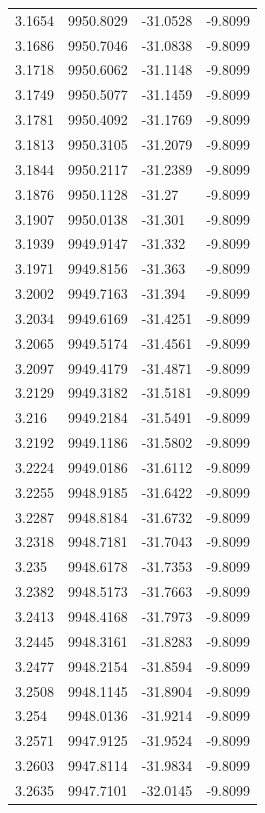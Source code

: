 \begin{table}[H]
\begin{tabular}{llll}
3.1654 & 9950.8029 & -31.0528 & -9.8099 \\
3.1686 & 9950.7046 & -31.0838 & -9.8099 \\
3.1718 & 9950.6062 & -31.1148 & -9.8099 \\
3.1749 & 9950.5077 & -31.1459 & -9.8099 \\
3.1781 & 9950.4092 & -31.1769 & -9.8099 \\
3.1813 & 9950.3105 & -31.2079 & -9.8099 \\
3.1844 & 9950.2117 & -31.2389 & -9.8099 \\
3.1876 & 9950.1128 & -31.27 & -9.8099 \\
3.1907 & 9950.0138 & -31.301 & -9.8099 \\
3.1939 & 9949.9147 & -31.332 & -9.8099 \\
3.1971 & 9949.8156 & -31.363 & -9.8099 \\
3.2002 & 9949.7163 & -31.394 & -9.8099 \\
3.2034 & 9949.6169 & -31.4251 & -9.8099 \\
3.2065 & 9949.5174 & -31.4561 & -9.8099 \\
3.2097 & 9949.4179 & -31.4871 & -9.8099 \\
3.2129 & 9949.3182 & -31.5181 & -9.8099 \\
3.216 & 9949.2184 & -31.5491 & -9.8099 \\
3.2192 & 9949.1186 & -31.5802 & -9.8099 \\
3.2224 & 9949.0186 & -31.6112 & -9.8099 \\
3.2255 & 9948.9185 & -31.6422 & -9.8099 \\
3.2287 & 9948.8184 & -31.6732 & -9.8099 \\
3.2318 & 9948.7181 & -31.7043 & -9.8099 \\
3.235 & 9948.6178 & -31.7353 & -9.8099 \\
3.2382 & 9948.5173 & -31.7663 & -9.8099 \\
3.2413 & 9948.4168 & -31.7973 & -9.8099 \\
3.2445 & 9948.3161 & -31.8283 & -9.8099 \\
3.2477 & 9948.2154 & -31.8594 & -9.8099 \\
3.2508 & 9948.1145 & -31.8904 & -9.8099 \\
3.254 & 9948.0136 & -31.9214 & -9.8099 \\
3.2571 & 9947.9125 & -31.9524 & -9.8099 \\
3.2603 & 9947.8114 & -31.9834 & -9.8099 \\
3.2635 & 9947.7101 & -32.0145 & -9.8099 \\

\end{tabular}
\end{table}
